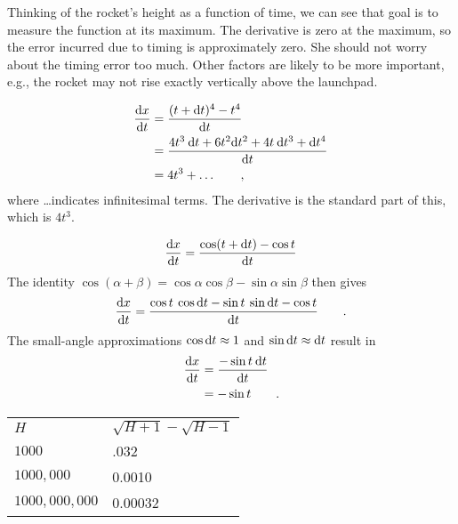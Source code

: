 
Thinking of the rocket's height as a function of time, we can see that goal is to measure
the function at its maximum. The derivative is zero at the maximum, so the error incurred
due to timing is approximately zero. She should not worry about the timing error too much.
Other factors are likely to be more important, e.g., the rocket may not rise exactly
vertically above the launchpad.



\begin{align*}
  \frac{\textup{d} x}{\textup{d} t} &= \frac{(t+\textup{d} t)^4-t^4}{\textup{d} t} \\
                        &= \frac{4t^3\:\textup{d} t + 6t^2\textup{d} t^2 + 4t\:\textup{d} t^3+\textup{d} t^4}{\textup{d} t} \\
                        &= 4t^3 + \ldots \qquad ,
\end{align*}
where \ldots indicates infinitesimal terms.
The derivative is the standard part of this, which is $4t^3$.


\begin{equation*}
  \frac{\textup{d} x}{\textup{d} t} = \frac{\cos(t+\textup{d} t)-\cos t}{\textup{d} t}
\end{equation*}
The identity $\cos(\alpha+\beta)=\cos\alpha\cos\beta-\sin\alpha\sin\beta$ then gives
\begin{equation*}
  \frac{\textup{d} x}{\textup{d} t} = \frac{\cos t \: \cos \textup{d} t - \sin t \: \sin \textup{d} t - \cos t}{\textup{d} t} \qquad .\\
\end{equation*}
The small-angle approximations  $\cos \textup{d} t\approx 1$ and $\sin \textup{d} t\approx \textup{d} t$
result in
\begin{align*}
\frac{\textup{d} x}{\textup{d} t}   &= \frac{-\sin t \: \textup{d} t}{\textup{d} t} \\
                        &= -\sin t \qquad .
\end{align*}


\begin{tabular}{ll}
$H$ & $\sqrt{H+1}-\sqrt{H-1}$ \\
$1000$ & .032 \\
$1000,000$ & 0.0010 \\
$1000,000,000$ & 0.00032 
\end{tabular}

